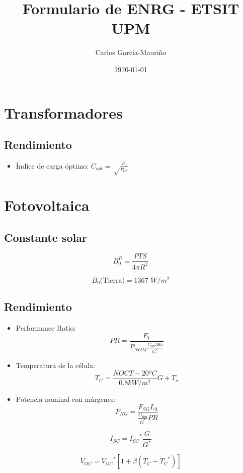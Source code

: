 \documentclass[12pt,a4paper]{article}
\title{Formulario de ENRG - ETSIT UPM}
\author{Carlos García-Mauriño}
\date{\today}
\begin{document}
\maketitle

\twocolumn

\section{Transformadores}
\label{sec:transformadores}

\subsection{Rendimiento}
\label{sub:rendimiento}

\begin{itemize}
		\item Índice de carga óptimo: $ C_{opt} = \sqrt \frac{P_0}{P_{CC}} $ 
\end{itemize}


\section{Fotovoltaica}
\label{sec:fotovoltaica}

\subsection{Constante solar}
\label{sub:constante_solar}

\[ B_{0}^{R} = \frac{PTS}{4 \pi R^2} \]

\[ B_0 \mbox{(Tierra)} = 1367 \,\,  W/m^2 \]

\subsection{Rendimiento}
\label{sub:rendimiento}

\begin{itemize}
		\item Performance Ratio:
				\[ PR = \frac{E_t}{P_{NOM} \frac{G_{da} 365}{G^{*}} } \]
		\item Temperatura de la célula:
				\[ T_C = \frac{NOCT - 20ºC}{0.8 kW/m^2} G + T_a \]
		\item Potencia nominal con márgenes:
				\[ P_{NG} = \frac{F_{SG} L_d}{ \frac{G_{dm}}{G^*} PR} \]
\end{itemize}

\[ I_{SC} = {I_{SC}}^{*} \frac{G}{G^*} \]

\[ V_{OC} = {V_{OC}}^* \left[ 1 + \beta (T_C - {T_C}^*) \right] \]
\end{document}
